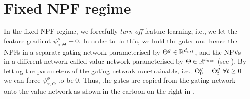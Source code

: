 \section{Fixed NPF regime}
In the fixed NPF regime, we forcefully \emph{turn-off} feature learning, i.e., we let the feature gradient $\psi^{\phi}_{x,\Theta}=0$. In order to do this, we hold the gates and hence the NPFs in a separate gating network parameterised by ${\Theta}^g\in\mathbb{R}^{d_{net}}$, and the NPVs in a different network called value network parameterised by $\Theta\in\mathbb{R}^{d_{net}}$ (see ). By letting the parameters of the gating network non-trainable, i.e., ${\Theta}^g_0={\Theta}^g_t,\forall t\geq 0$ we can force $\psi^{\phi}_{x,\Theta}$ to be $0$. Thus, the gates are copied from the gating network onto the value network as shown in the cartoon on the right in .
\begin{table}[h] 
\begin{minipage}{0.75\columnwidth}
\end{minipage}
\begin{minipage}{0.24\columnwidth}
\end{minipage}
\caption{Setup to learn with fixed NPFs.}
\label{tb:dgn}
\end{table}
